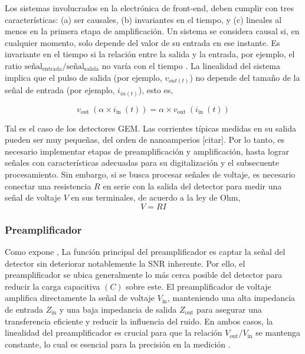 \documentclass[]{book}
\begin{document}
\noindent Los sistemas involucrados en la electrónica de front-end, deben cumplir con tres características: (a) ser causales, (b) invariantes en el tiempo, y (c) lineales al menos en la primera etapa de amplificación. Un sistema se considera causal si, en cualquier momento, solo depende del valor de su entrada en ese instante. Es invariante en el tiempo si la relación entre la salida y la entrada, por ejemplo, el ratio $\text{señal}_{\text{entrada}}/\text{señal}_{\text{salida}}$ no varía con el tiempo \cite{kolanoski2020particle}. La linealidad del sistema implica que el pulso de salida (por ejemplo, $v_{out(t)}$) no depende del tamaño de la señal de entrada (por ejemplo, $i_{in(t)}$), esto es, 

$$
v_{\text {out }}\left(\alpha \times i_{\text {in }}(t)\right)=\alpha \times v_{\text {out }}\left(i_{\text {in }}(t)\right)
$$

\noindent Tal es el caso de los detectores GEM. Las corrientes típicas medidas en su salida pueden ser muy pequeñas, del orden de nanoamperios [citar]. Por lo tanto, es necesario implementar etapas de preamplificación y amplificación, hasta lograr señales con características adecuadas para su digitalización y el subsecuente procesamiento. Sin embargo, si se busca procesar señales de voltaje, es necesario conectar una resistencia $R$ en serie con la salida del detector para medir una señal de voltaje $V$ en sus terminales, de acuerdo a la ley de Ohm, $$V = R I$$ 

\subsubsection{Preamplificador}

\noindent Como expone \cite{knoll2010radiation}, La función principal del preamplificador es captar la señal del detector sin deteriorar notablemente la SNR inherente. Por ello, el preamplificador se ubica generalmente lo más cerca posible del detector para reducir la carga capacitiva $(C)$ sobre este. El preamplificador de voltaje amplifica directamente la señal de voltaje $V_{\text{in}}$, manteniendo una alta impedancia de entrada $Z_{\text{in}}$ y una baja impedancia de salida $Z_{\text{out}}$ para asegurar una transferencia eficiente y reducir la influencia del ruido. En ambos casos, la linealidad del preamplificador es crucial para que la relación $V_{\text{out}}/ V_{\text{in}}$ se mantenga constante, lo cual es esencial para la precisión en la medición \cite{leo1994techniques}.\\
\end{document}
